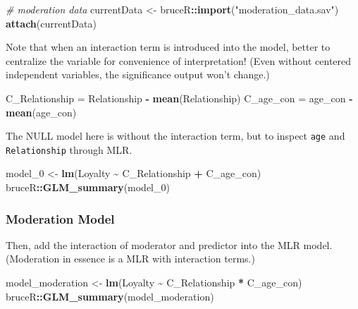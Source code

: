\documentclass[
]{ctexart}
\newenvironment{Shaded}{\begin{snugshade}}{\end{snugshade}}
\newcommand{\CommentTok}[1]{\textcolor[rgb]{0.56,0.35,0.01}{\textit{#1}}}
\newcommand{\FunctionTok}[1]{\textcolor[rgb]{0.13,0.29,0.53}{\textbf{#1}}}
\newcommand{\NormalTok}[1]{#1}
\newcommand{\OtherTok}[1]{\textcolor[rgb]{0.56,0.35,0.01}{#1}}
\newcommand{\SpecialCharTok}[1]{\textcolor[rgb]{0.81,0.36,0.00}{\textbf{#1}}}
\newcommand{\StringTok}[1]{\textcolor[rgb]{0.31,0.60,0.02}{#1}}
\begin{document}
\begin{Shaded}
\begin{Highlighting}[]
\CommentTok{\# moderation data}
\NormalTok{currentData }\OtherTok{\textless{}{-}}\NormalTok{ bruceR}\SpecialCharTok{::}\FunctionTok{import}\NormalTok{(}\StringTok{"moderation\_data.sav"}\NormalTok{)}
\FunctionTok{attach}\NormalTok{(currentData)}
\end{Highlighting}
\end{Shaded}

Note that when an interaction term is introduced into the model, better
to centralize the variable for convenience of interpretation! (Even
without centered independent variables, the significance output won't
change.)

\begin{Shaded}
\begin{Highlighting}[]
\NormalTok{C\_Relationship }\OtherTok{=}\NormalTok{ Relationship }\SpecialCharTok{{-}} \FunctionTok{mean}\NormalTok{(Relationship)}
\NormalTok{C\_age\_con }\OtherTok{=}\NormalTok{ age\_con }\SpecialCharTok{{-}} \FunctionTok{mean}\NormalTok{(age\_con)}
\end{Highlighting}
\end{Shaded}

The NULL model here is without the interaction term, but to inspect
\texttt{age} and \texttt{Relationship} through MLR.

\begin{Shaded}
\begin{Highlighting}[]
\NormalTok{model\_0 }\OtherTok{\textless{}{-}} \FunctionTok{lm}\NormalTok{(Loyalty }\SpecialCharTok{\textasciitilde{}}\NormalTok{ C\_Relationship }\SpecialCharTok{+}\NormalTok{ C\_age\_con)}
\NormalTok{bruceR}\SpecialCharTok{::}\FunctionTok{GLM\_summary}\NormalTok{(model\_0)}
\end{Highlighting}
\end{Shaded}

\hypertarget{moderation-model}{%
\subsubsection{Moderation Model}\label{moderation-model}}

Then, add the interaction of moderator and predictor into the MLR model.
(Moderation in essence is a MLR with interaction terms.)

\begin{Shaded}
\begin{Highlighting}[]
\NormalTok{model\_moderation }\OtherTok{\textless{}{-}} \FunctionTok{lm}\NormalTok{(Loyalty }\SpecialCharTok{\textasciitilde{}}\NormalTok{ C\_Relationship }\SpecialCharTok{*}\NormalTok{ C\_age\_con)}
\NormalTok{bruceR}\SpecialCharTok{::}\FunctionTok{GLM\_summary}\NormalTok{(model\_moderation)}
\end{Highlighting}
\end{Shaded}
\end{document}
